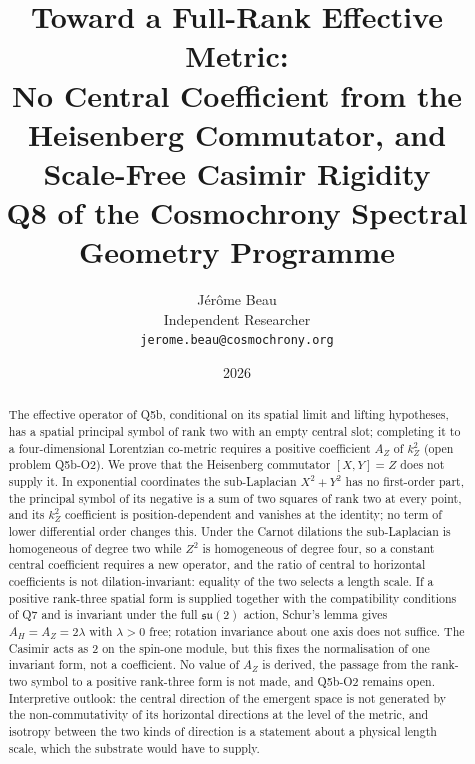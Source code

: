 \documentclass[11pt,a4paper]{article}
\theoremstyle{definition}
\theoremstyle{remark}
\begin{document}
  \title{Toward a Full-Rank Effective Metric:\\
  No Central Coefficient from the Heisenberg Commutator, and Scale-Free Casimir Rigidity\\[0.4em]
  \large Q8 of the Cosmochrony Spectral Geometry Programme}
  \author{J\'er\^ome Beau\\
  \small Independent Researcher\\
  \small \texttt{jerome.beau@cosmochrony.org}}
  \date{2026}
  \maketitle

  \begin{abstract}
    The effective operator of Q5b, conditional on its spatial limit and lifting hypotheses, has a spatial principal
    symbol of rank two with an empty central slot; completing it to a four-dimensional Lorentzian co-metric requires
    a positive coefficient $A_Z$ of $k_Z^2$ (open problem Q5b-O2).
    We prove that the Heisenberg commutator $[X, Y] = Z$ does not supply it.
    In exponential coordinates the sub-Laplacian $X^2 + Y^2$ has no first-order part, the principal symbol of its
    negative is a sum of two squares of rank two at every point, and its $k_Z^2$ coefficient is position-dependent
    and vanishes at the
    identity; no term of lower differential order changes this.
    Under the Carnot dilations the sub-Laplacian is homogeneous of degree two while $Z^2$ is homogeneous of degree
    four, so a constant central coefficient requires a new operator, and the ratio of central to horizontal
    coefficients is not dilation-invariant: equality of the two selects a length scale.
    If a positive rank-three spatial form is supplied together with the compatibility conditions of Q7 and is
    invariant under the full $\mathfrak{su}(2)$ action, Schur's lemma gives $A_H = A_Z = 2\lambda$ with $\lambda > 0$
    free; rotation invariance about one axis does not suffice.
    The Casimir acts as 2 on the spin-one module, but this fixes the normalisation of one invariant form, not a
    coefficient.
    No value of $A_Z$ is derived, the passage from the rank-two symbol to a positive rank-three form is not made, and
    Q5b-O2 remains open.
    Interpretive outlook: the central direction of the emergent space is not generated by the non-commutativity of
    its horizontal directions at the level of the metric, and isotropy between the two kinds of direction is a
    statement about a physical length scale, which the substrate would have to supply.
  \end{abstract}
\end{document}
